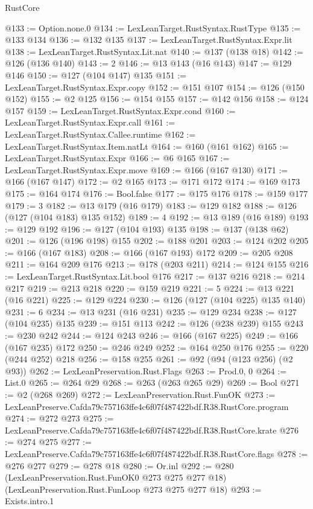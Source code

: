 \begin{lexlean}{RustCore}
\begin{coremodule}
@133 := Option.none.{0}
@134 := LexLeanTarget.RustSyntax.RustType
@135 := @133 @134
@136 := @132 @135
@137 := LexLeanTarget.RustSyntax.Expr.lit
@138 := LexLeanTarget.RustSyntax.Lit.nat
@140 := @137 (@138 @18)
@142 := @126 (@136 @140)
@143 := 2
@146 := @13 @143 (@16 @143)
@147 := @129 @146
@150 := @127 (@104 @147) @135
@151 := LexLeanTarget.RustSyntax.Expr.copy
@152 := @151 @107
@154 := @126 (@150 @152)
@155 := @2 @125
@156 := @154 @155
@157 := @142 @156
@158 := @124 @157
@159 := LexLeanTarget.RustSyntax.Expr.cond
@160 := LexLeanTarget.RustSyntax.Expr.call
@161 := LexLeanTarget.RustSyntax.Callee.runtime
@162 := LexLeanTarget.RustSyntax.Item.natLt
@164 := @160 (@161 @162)
@165 := LexLeanTarget.RustSyntax.Expr
@166 := @6 @165
@167 := LexLeanTarget.RustSyntax.Expr.move
@169 := @166 (@167 @130)
@171 := @166 (@167 @147)
@172 := @2 @165
@173 := @171 @172
@174 := @169 @173
@175 := @164 @174
@176 := Bool.false
@177 := @175 @176
@178 := @159 @177
@179 := 3
@182 := @13 @179 (@16 @179)
@183 := @129 @182
@188 := @126 (@127 (@104 @183) @135 @152)
@189 := 4
@192 := @13 @189 (@16 @189)
@193 := @129 @192
@196 := @127 (@104 @193) @135
@198 := @137 (@138 @62)
@201 := @126 (@196 @198) @155
@202 := @188 @201
@203 := @124 @202
@205 := @166 (@167 @183)
@208 := @166 (@167 @193) @172
@209 := @205 @208
@211 := @164 @209 @176
@213 := @178 (@203 @211)
@214 := @124 @155
@216 := LexLeanTarget.RustSyntax.Lit.bool @176
@217 := @137 @216
@218 := @214 @217
@219 := @213 @218
@220 := @159 @219
@221 := 5
@224 := @13 @221 (@16 @221)
@225 := @129 @224
@230 := @126 (@127 (@104 @225) @135 @140)
@231 := 6
@234 := @13 @231 (@16 @231)
@235 := @129 @234
@238 := @127 (@104 @235) @135
@239 := @151 @113
@242 := @126 (@238 @239) @155
@243 := @230 @242
@244 := @124 @243
@246 := @166 (@167 @225)
@249 := @166 (@167 @235) @172
@250 := @246 @249
@252 := @164 @250 @176
@255 := @220 (@244 @252) @218
@256 := @158 @255
@261 := @92 (@94 (@123 @256) (@2 @93))
@262 := LexLeanPreservation.Rust.Flags
@263 := Prod.{0, 0}
@264 := List.{0}
@265 := @264 @29
@268 := @263 (@263 @265 @29)
@269 := Bool
@271 := @2 (@268 @269)
@272 := LexLeanPreservation.Rust.FunOK
@273 := LexLeanPreserve.Cafda79c757163ffe4c6f07f487422bdf.R38.RustCore.program
@274 := @272 @273
@275 := LexLeanPreserve.Cafda79c757163ffe4c6f07f487422bdf.R38.RustCore.krate
@276 := @274 @275
@277 := LexLeanPreserve.Cafda79c757163ffe4c6f07f487422bdf.R38.RustCore.flags
@278 := @276 @277
@279 := @278 @18
@280 := Or.inl
@292 := @280
    (LexLeanPreservation.Rust.FunOK0 @273 @275 @277 @18)
    (LexLeanPreservation.Rust.FunLoop @273 @275 @277 @18)
@293 := Exists.intro.{1}

\end{coremodule}
\end{lexlean}
